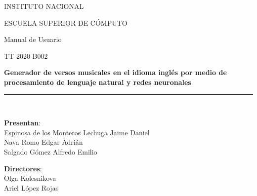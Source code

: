 \documentclass[12pt, a4paper, titlepage]{article}
\begin{document}
\begin{titlepage}
		\vspace*{.25cm}								%
		
		\begin{center}
			
			\begin{LARGE}
				\textcolor{guindapoli}{INSTITUTO NACIONAL}\\
			\end{LARGE}	
			
			\vspace*{0.2in}
			
			\begin{Large}
				\textcolor{azulescom}{ESCUELA SUPERIOR DE CÓMPUTO}\\
			\end{Large}	
		
			\vspace*{0.4in}
			
			\begin{large}
				Manual de Usuario\\
			\end{large}	
			
			\vspace*{0.4in}
			
			\begin{large}
			TT 2020-B002\\
			\end{large}
			
			\vspace*{0.2in}
			
			\begin{Large}
				\textbf{Generador de versos musicales en el idioma
					inglés por medio de procesamiento de lenguaje
					natural y redes neuronales}\\
			\end{Large}
						
			\vspace*{0.2in}
			
			\rule{80mm}{.1mm}\\
			\vspace*{0.1in}
			
			\begin{large}
				\begin{center}
					\textbf{Presentan}:\\
					Espinosa de los Monteros Lechuga Jaime Daniel\\
					Nava Romo Edgar Adrián\\
					Salgado Gómez Alfredo Emilio\\
				\end{center}
			\end{large}
			
			\begin{large}
				\textbf{Directores}:\\
				Olga Kolesnikova\\
				Ariel López Rojas\\
			\end{large}
			
		\end{center}
		
	\end{titlepage}
	
\end{document}

